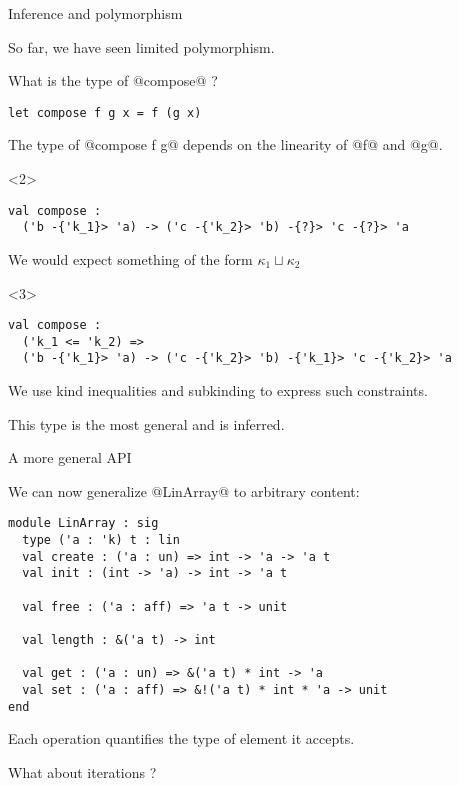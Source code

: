 \documentclass[xcolor=svgnames,11pt]{beamer}
\begin{document}
\begin{frame}[t,fragile]{Inference and polymorphism}

  So far, we have seen limited polymorphism.

  What is the type of @compose@ ?

\begin{lstlisting}
let compose f g x = f (g x)
\end{lstlisting}

  The type of @compose f g@ depends on the linearity of @f@ and @g@.
\begin{onlyenv}<2>
\begin{lstlisting}
val compose :
  ('b -{'k_1}> 'a) -> ('c -{'k_2}> 'b) -{?}> 'c -{?}> 'a
\end{lstlisting}\pause

We would expect something of the form $\kappa_1 \sqcup \kappa_2$
\end{onlyenv}

\begin{onlyenv}<3>
\begin{lstlisting}
val compose :
  ('k_1 <= 'k_2) =>
  ('b -{'k_1}> 'a) -> ('c -{'k_2}> 'b) -{'k_1}> 'c -{'k_2}> 'a
\end{lstlisting}

We use kind inequalities and subkinding to express such constraints.

This type is the most general and is inferred.
\end{onlyenv}

\end{frame}


\begin{frame}[fragile]{A more general API}

We can now generalize @LinArray@ to arbitrary content:

\begin{lstlisting}
module LinArray : sig
  type ('a : 'k) t : lin
  val create : ('a : un) => int -> 'a -> 'a t
  val init : (int -> 'a) -> int -> 'a t
  
  val free : ('a : aff) => 'a t -> unit
  
  val length : &('a t) -> int
  
  val get : ('a : un) => &('a t) * int -> 'a
  val set : ('a : aff) => &!('a t) * int * 'a -> unit
end
\end{lstlisting}

Each operation quantifies the type of element it accepts.\pause

What about iterations ?

\end{frame}
\end{document}
